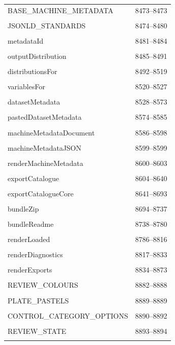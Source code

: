 {\begin{longtable}{@{}p{11cm}r@{}}
BASE\_MACHINE\_METADATA & 8473--8473 \\\\\hline
JSONLD\_STANDARDS & 8474--8480 \\\\\hline
metadataId & 8481--8484 \\\\\hline
outputDistribution & 8485--8491 \\\\\hline
distributionsFor & 8492--8519 \\\\\hline
variablesFor & 8520--8527 \\\\\hline
datasetMetadata & 8528--8573 \\\\\hline
pastedDatasetMetadata & 8574--8585 \\\\\hline
machineMetadataDocument & 8586--8598 \\\\\hline
machineMetadataJSON & 8599--8599 \\\\\hline
renderMachineMetadata & 8600--8603 \\\\\hline
exportCatalogue & 8604--8640 \\\\\hline
exportCatalogueCore & 8641--8693 \\\\\hline
bundleZip & 8694--8737 \\\\\hline
bundleReadme & 8738--8780 \\\\\hline
renderLoaded & 8786--8816 \\\\\hline
renderDiagnostics & 8817--8833 \\\\\hline
renderExports & 8834--8873 \\\\\hline
REVIEW\_COLOURS & 8882--8888 \\\\\hline
PLATE\_PASTELS & 8889--8889 \\\\\hline
CONTROL\_CATEGORY\_OPTIONS & 8890--8892 \\\\\hline
REVIEW\_STATE & 8893--8894 \\\\\hline

\end{longtable}}
